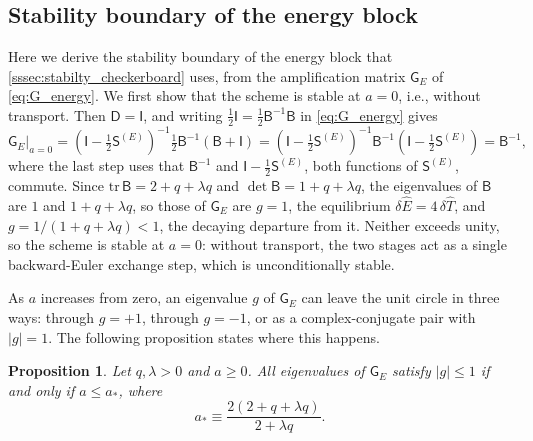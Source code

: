 \documentclass[preprint,12pt,authoryear]{elsarticle}
\newcommand{\tenS}{\mathsf{S}}
\newcommand{\tenI}{\mathsf{I}}
\newcommand{\tenG}{\mathsf{G}}
\providecommand{\tenD}{\mathsf{D}}
\providecommand{\tenB}{\mathsf{B}}
\newtheorem{prop}{Proposition}
\newcommand{\hE}{\hat{E}}
\newcommand{\hT}{\hat{T}}
\begin{document}
\clearpage

\begin{appendix}
\setcounter{prop}{0}
\setcounter{lem}{0}
\makeatletter
{}
\makeatother
\renewcommand{\theprop}{\Alph{section}.\arabic{prop}}
\renewcommand{\thelem}{\Alph{section}.\arabic{lem}}

\section{Stability boundary of the energy block}
\label{app:proofs}

Here we derive the stability boundary of the energy block that \autoref{sssec:stabilty_checkerboard} uses, from the amplification matrix $\tenG_E$ of \autoref{eq:G_energy}. We first show that the scheme is stable at $a = 0$, i.e., without transport. Then $\tenD = \tenI$, and writing $\tfrac{1}{2}\tenI = \tfrac{1}{2}\tenB^{-1}\tenB$ in \autoref{eq:G_energy} gives
\begin{equation}
    \tenG_E\big|_{a = 0}
    = \left(\tenI - \tfrac{1}{2}\tenS^{(E)}\right)^{-1}\tfrac{1}{2}\tenB^{-1}\left(\tenB + \tenI\right)
    = \left(\tenI - \tfrac{1}{2}\tenS^{(E)}\right)^{-1}\tenB^{-1}\left(\tenI - \tfrac{1}{2}\tenS^{(E)}\right)
    = \tenB^{-1},
    \label{eq:G_a0}
\end{equation}
where the last step uses that $\tenB^{-1}$ and $\tenI - \tfrac{1}{2}\tenS^{(E)}$, both functions of $\tenS^{(E)}$, commute. Since $\mathrm{tr}\,\tenB = 2 + q + \lambda q$ and $\det\tenB = 1 + q + \lambda q$, the eigenvalues of $\tenB$ are $1$ and $1 + q + \lambda q$, so those of $\tenG_E$ are $g = 1$, the equilibrium $\delta\hE = 4\,\delta\hT$, and $g = 1/(1 + q + \lambda q) < 1$, the decaying departure from it. Neither exceeds unity, so the scheme is stable at $a = 0$: without transport, the two stages act as a single backward-Euler exchange step, which is unconditionally stable.

As $a$ increases from zero, an eigenvalue $g$ of $\tenG_E$ can leave the unit circle in three ways: through $g = +1$, through $g = -1$, or as a complex-conjugate pair with $|g| = 1$. The following proposition states where this happens.

\begin{prop}
\label{prop:energy_block}
Let $q, \lambda > 0$ and $a \geq 0$. All eigenvalues of $\tenG_E$ satisfy $|g| \leq 1$ if and only if $a \leq a_*$, where
\begin{equation}
    a_* \equiv \frac{2\left(2 + q + \lambda q\right)}{2 + \lambda q} .
    \label{eq:boundary_a}
\end{equation}
\end{prop}


\end{appendix}
\end{document}
